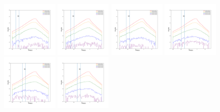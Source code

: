 \documentclass[12pt,prd]{article}
\begin{document}
\begin{figure}[h!]
\centering
\includegraphics[width=0.24\textwidth]{../figures/scanning_plotsgaiascan_l101_2_b58_4_ra212_7_dec55_2_npy_0.pdf}
\includegraphics[width=0.24\textwidth]{../figures/scanning_plotsgaiascan_l101_2_b58_4_ra212_7_dec55_2_npy_1.pdf}
\includegraphics[width=0.24\textwidth]{../figures/scanning_plotsgaiascan_l101_2_b58_4_ra212_7_dec55_2_npy_2.pdf}
\includegraphics[width=0.24\textwidth]{../figures/scanning_plotsgaiascan_l101_2_b58_4_ra212_7_dec55_2_npy_3.pdf}
\includegraphics[width=0.24\textwidth]{../figures/scanning_plotsgaiascan_l101_2_b58_4_ra212_7_dec55_2_npy_4.pdf}
\includegraphics[width=0.24\textwidth]{../figures/scanning_plotsgaiascan_l101_2_b58_4_ra212_7_dec55_2_npy_5.pdf}

\end{figure}
\end{document}
